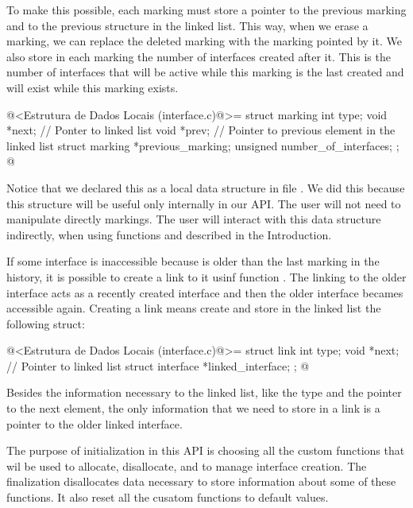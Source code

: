 To make this possible, each marking must store a pointer to the
previous marking and to the previous structure in the linked
list. This way, when we erase a marking, we can replace the deleted
marking with the marking pointed by it. We also store in each marking
the number of interfaces created after it. This is the number of
interfaces that will be active while this marking is the last created
and will exist while this marking exists.

\iniciocodigo
@<Estrutura de Dados Locais (interface.c)@>=
struct marking {
  int type;
  void *next; // Ponter to linked list
  void *prev; // Pointer to previous element in the linked list
  struct marking *previous_marking;
  unsigned number_of_interfaces;
};
@
\fimcodigo

Notice that we declared this as a local data structure in file
. We did this because this structure will be
useful only internally in our API. The user will not need to
manipulate directly markings. The user will interact with this data
structure indirectly, when using functions
 and
 described in the
Introduction.


If some interface is inaccessible because is older than the last
marking in the history, it is possible to create a link to it usinf
function . The linking to the older
interface acts as a recently created interface and then the older
interface becames accessible again. Creating a link means create and
store in the linked list the following struct:

\iniciocodigo
@<Estrutura de Dados Locais (interface.c)@>=
struct link{
  int type;
  void *next; // Pointer to linked list
  struct interface *linked_interface;
};
@
\fimcodigo

Besides the information necessary to the linked list, like the type
and the pointer to the next element, the only information that we need
to store in a link is a pointer to the older linked interface.


The purpose of initialization in this API is choosing all the custom
functions that wil be used to allocate, disallocate, and to manage
interface creation. The finalization disallocates data necessary to
store information about some of these functions. It also reset all the
cusatom functions to default values.

